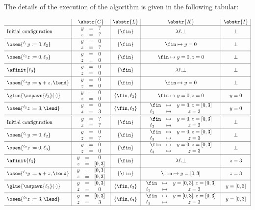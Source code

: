 \documentclass[12pt]{article}
\let\n\newcommand
\newcommand{\li}[1]{ {}^{\ell_{#1}}  }
\newcommand{\fleche}{\mapsto}
\newcommand{\func}[2]{\lambda #1. #2 } \newcommand{\fx}[3]{#1[#2 \fleche #3]} \newcommand{\nf}[3]{#1\smallsetminus[#2 \fleche #3]}  \newcommand{\ndf}[2]{#1(#2)\uparrow}
\begin{document}
The details of the execution of the algorithm is given in the following tabular:

\n{\bigK}[1]{\begin{array}{lcc}\fin&\mapsto& y=#1, z=[0,3]\\\ell_3&\mapsto& z=3\end{array}}
\n{\ExStore}[2]{\begin{array}{lcc} y &=&#1\\z&=&#2  \end{array}}

\noindent\(
\begin{array}{l|c|c|c|c|}
 & \abstr{C} & \abstr{L} & \abstr{K} & \abstr{I}\\ 
 \hline
 \text{Initial configuration} & \ExStore{?}{?} & \{\fin\} & \func{\ell}{\bot} & \bot \\
 \hline
 \osem{\li1 y:=0,\ell_2} & \ExStore{0}{?} & \{\fin\} & \fin\mapsto y=0 &\bot\\
 \hline
 \osem{\li2 z:=0,\ell_3} & \ExStore{0}{0} & \{\fin\} &\fin\mapsto y=0, z=0 &\bot\\
 \hline
 \afinit{\ell_3}&\ExStore{0}{0} & \{\fin\} &\func{\ell}{\bot} &\bot \\
 \hline
 \osem{\li4y:=y+z,\lend} & \ExStore{0}{0} &  \{\fin\} &\fin\mapsto y=0 &\bot\\
\hline
 \glue{\aspawn{\ell_3}(\cdot)} & \ExStore{0}{0} & \{\fin,\ell_3\} & \fin\mapsto y=0, z=0 & y=0\\
\hline
 \osem{\li5 z:=3,\lend} & \ExStore{0}{3} &\{\fin,\ell_3\} & \bigK{0} &y=0 \\
\hline
\hline
 \text{Initial configuration} & \ExStore{?}{?} & \{\fin\} & \bigK{0} & \bot \\
 \hline
 \osem{\li1 y:=0,\ell_2} & \ExStore{0}{?} & \{\fin\} & \bigK{0} &\bot\\
 \hline
 \osem{\li2 z:=0,\ell_3} & \ExStore{0}{0} & \{\fin\} &\bigK{0} &\bot\\
 \hline
 \afinit{\ell_3}&\ExStore{0}{[0,3]} & \{\fin\} &\func{\ell}{\bot} &z=3 \\
 \hline
 \osem{\li4y:=y+z,\lend} & \ExStore{[0,3]}{[0,3]} &  \{\fin\} &\fin\mapsto y=[0,3] &z=3\\
\hline
 \glue{\aspawn{\ell_3}(\cdot)} & \ExStore{[0,3]}{0} & \{\fin,\ell_3\} & \bigK{[0,3]} & y=[0,3]\\
\hline
 \osem{\li5 z:=3,\lend} & \ExStore{[0,3]}{3}& \{\fin,\ell_3\} & \bigK{[0,3]} &y=[0, 3] \\
\hline
\end{array}\)
\end{document}
